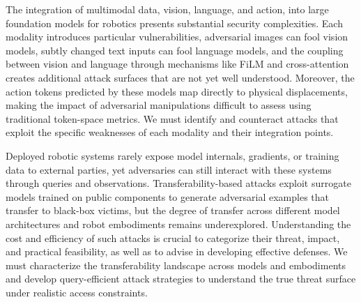 \documentclass[11pt,letterpaper]{article}
\begin{document}
The integration of multimodal data, \ie vision, language, and action, into large foundation models for robotics presents substantial security complexities. 
Each modality introduces particular vulnerabilities, \ie adversarial images can fool vision models, subtly changed text inputs can fool language models, and the coupling between vision and language through mechanisms like FiLM and cross-attention creates additional attack surfaces that are not yet well understood.
Moreover, the action tokens predicted by these models map directly to physical displacements, making the impact of adversarial manipulations difficult to assess using traditional token-space metrics.
We must identify and counteract attacks that exploit the specific weaknesses of each modality and their integration points.


Deployed robotic systems rarely expose model internals, gradients, or training data to external parties, yet adversaries can still interact with these systems through queries and observations.
Transferability-based attacks exploit surrogate models trained on public components to generate adversarial examples that transfer to black-box victims, but the degree of transfer across different model architectures and robot embodiments remains underexplored.
Understanding the cost and efficiency of such attacks is crucial to categorize their threat, impact, and practical feasibility, as well as to advise in developing effective defenses.
We must characterize the transferability landscape across models and embodiments and develop query-efficient attack strategies to understand the true threat surface under realistic access constraints.
\end{document}
